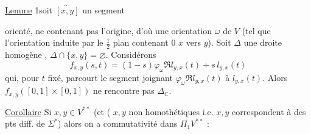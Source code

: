 \uline{Lemme} 1\quad soit $\overleftrightarrow{[x,y]}$ un segment


orienté, ne contenant pas l'origine, d'où
une orientation $\omega$ de $V$
(tel que l'orientation  induite par le
$\frac12$ plan contenant \deleted{$\unsure{\Delta}$} $0$
  
$x$ vers $y$).
 Soit
$\Delta$ une droite homogène ,
 
 $\Delta\cap\{x,y\}=\varnothing$.
Considérons
\[
f_{x,y}(s,t)=(1-s)\varphi_\omega\Re l_{y,x}(t)+s\,l_{y,x}(t)
\]
qui, pour $t$ fixé, parcourt le segment joignant
$\varphi_\omega\Re l_{y,x}(t)$ à $l_{y,x}(t)$. Alors
$f_{x,y}([0,1]\times[0,1])$ ne rencontre pas $\Delta_{\mathbb C}$.


\uline{Corollaire}\quad {}
Si $x,y\in V^{**}$  (et
( $x,y$ non homothétiques i.e. $x,y$ correspondent
à des pts diff. de $\Sigma^*$) alors on a
commutativité dans $\Pi_1V^{**}$ :
